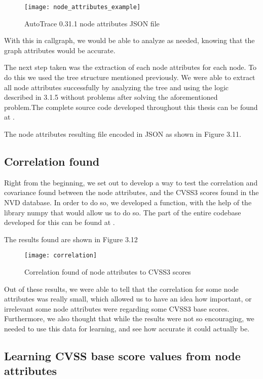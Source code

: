\begin{figure}[!htb]
	\caption{AutoTrace 0.31.1 node attributes JSON file}
	\centering
	\texttt{[image: node\_attributes\_example]}
\end{figure}

With this in callgraph, we would be able to analyze as needed, knowing that the graph attributes would be accurate.

The next step taken was the extraction of each node attributes for each node. To do this we used the tree structure mentioned previously. We were able to extract all node attributes successfully by analyzing the tree and using the logic described in 3.1.5 without problems after solving the aforementioned problem.The complete source code developed throughout this thesis can be found at \parencite{ricardo} .


The node attributes resulting file encoded in JSON as shown in Figure 3.11.

\subsection{Correlation found}


Right from the beginning, we set out to develop a way to test the correlation and covariance found between the node attributes, and the CVSS3 scores found in the NVD database. In order to do so, we developed a function, with the help of the library numpy \parencite{numpy} that would allow us to do so. The part of the entire codebase developed for this can be found at \parencite{ricardo} .

The results found are shown in Figure 3.12

\begin{figure}[!htb]
	\caption{Correlation found of node attributes to CVSS3 scores}
	\centering
	\texttt{[image: correlation]}
\end{figure}

Out of these results, we were able to tell that the correlation for some node attributes was really small, which allowed us to have an idea how important, or irrelevant some node attributes were regarding some CVSS3 base scores. Furthermore, we also thought that while the results were not so encouraging, we needed to use this data for learning, and see how accurate it could actually be.

\subsection{Learning CVSS base score values from node attributes}

